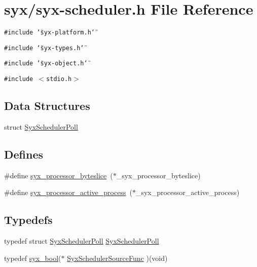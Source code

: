 \hypertarget{syx-scheduler_8h}{
\section{syx/syx-scheduler.h File Reference}
\label{syx-scheduler_8h}
}
{\tt \#include \char`\"{}syx-platform.h\char`\"{}}\par
{\tt \#include \char`\"{}syx-types.h\char`\"{}}\par
{\tt \#include \char`\"{}syx-object.h\char`\"{}}\par
{\tt \#include $<$stdio.h$>$}\par
\subsection*{Data Structures}
\begin{CompactItemize}
\item 
struct \hyperlink{struct_syx_scheduler_poll}{SyxSchedulerPoll}
\end{CompactItemize}
\subsection*{Defines}
\begin{CompactItemize}
\item 
\#define \hyperlink{syx-scheduler_8h_a45ab87994042ea76587b30a1599aee1}{syx\_\-processor\_\-byteslice}~($\ast$\_\-syx\_\-processor\_\-byteslice)
\item 
\#define \hyperlink{syx-scheduler_8h_3785c5106dbc4cdcb992b6d17024da72}{syx\_\-processor\_\-active\_\-process}~($\ast$\_\-syx\_\-processor\_\-active\_\-process)
\end{CompactItemize}
\subsection*{Typedefs}
\begin{CompactItemize}
\item 
typedef struct \hyperlink{struct_syx_scheduler_poll}{SyxSchedulerPoll} \hyperlink{syx-scheduler_8h_27742a78647c979f853102fc71347c59}{SyxSchedulerPoll}
\item 
typedef \hyperlink{syx-types_8h_c6dc09b276b99fa1956364359139daab}{syx\_\-bool}($\ast$ \hyperlink{syx-scheduler_8h_6c2e31a7f026cdd3d5eb1fc0d263c63a}{SyxSchedulerSourceFunc} )(void)
\end{CompactItemize}
